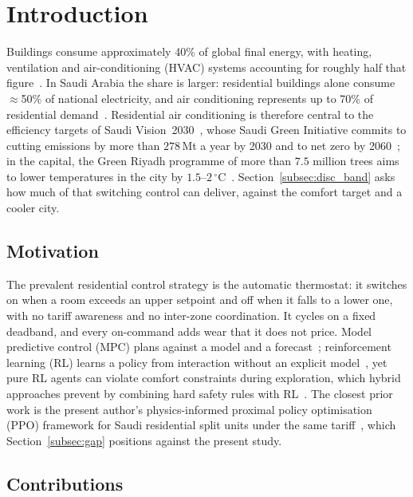 \documentclass[3p,twocolumn,number]{elsarticle}
\begin{document}
\section{Introduction}
\label{sec:intro}
 
Buildings consume approximately 40\% of global final energy, with heating, ventilation and air-conditioning (HVAC) systems accounting for roughly half that figure~\cite{PerezLombard2008}. In Saudi Arabia the share is larger: residential buildings alone consume $\approx$50\% of national electricity, and air conditioning represents up to 70\% of residential demand~\cite{AlHomoud2021,Krarti2020}. Residential air conditioning is therefore central to the efficiency targets of Saudi Vision~2030~\cite{Belaid2025}, whose Saudi Green Initiative commits to cutting emissions by more than $278\,$Mt a year by 2030 and to net zero by 2060~\cite{SGI2021}; in the capital, the Green Riyadh programme of more than $7.5$ million trees aims to lower temperatures in the city by $1.5$--$2\,^\circ$C~\cite{GreenRiyadh2019}. Section~\ref{subsec:disc_band} asks how much of that switching control can deliver, against the comfort target and a cooler city.
 
\subsection{Motivation}
 
The prevalent residential control strategy is the automatic thermostat: it switches on when a room exceeds an upper setpoint and off when it falls to a lower one, with no tariff awareness and no inter-zone coordination. It cycles on a fixed deadband, and every on-command adds wear that it does not price. Model predictive control (MPC) plans against a model and a forecast~\cite{Drgona2020}; reinforcement learning (RL) learns a policy from interaction without an explicit model~\cite{AlSayed2024,Biemann2021,Azuatalam2020}, yet pure RL agents can violate comfort constraints during exploration, which hybrid approaches prevent by combining hard safety rules with RL~\cite{Xu2025}. The closest prior work is the present author's physics-informed proximal policy optimisation (PPO) framework for Saudi residential split units under the same tariff~\cite{Faraj2026}, which Section~\ref{subsec:gap} positions against the present study.

 
\subsection{Contributions}
 
\end{document}
